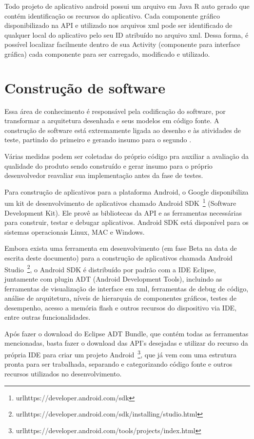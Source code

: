 Todo projeto de aplicativo android possui um arquivo em Java R auto gerado que contém identificação os recursos do aplicativo. Cada componente gráfico disponibilizado na API e utilizado nos arquivos xml pode ser identificado de qualquer local do aplicativo pelo seu ID atribuído no arquivo xml. Dessa forma, é possível localizar facilmente dentro de sua Activity (componente para interface gráfica) cada componente para ser carregado, modificado e utilizado.

\section{Construção de software}

Essa área de conhecimento é responsável pela codificação do software, por transformar a arquitetura desenhada e seus modelos em código fonte. A construção de software está extremamente ligada ao desenho e às atividades de teste, partindo do primeiro e gerando insumo para o segundo \cite{swebok}.

Várias medidas podem ser coletadas do próprio código pra auxiliar a avaliação da qualidade do produto sendo construído e gerar insumo para o próprio desenvolvedor reavaliar sua implementação antes da fase de testes.

Para construção de aplicativos para a plataforma Android, o Google disponibiliza um kit de desenvolvimento de aplicativos chamado Android SDK~\footnote{url{https://developer.android.com/sdk}} (Software Development Kit). Ele provê as bibliotecas da API e as ferramentas necessárias para construir, testar e debugar aplicativos. Android SDK está disponível para os sistemas operacionais Linux, MAC e Windows.

Embora exista uma ferramenta em desenvolvimento (em fase Beta na data de escrita deste documento) para a construção de aplicativos chamada Android Studio~\footnote{url{https://developer.android.com/sdk/installing/studio.html}}, o Android SDK é distribuído por padrão com a IDE Eclipse, juntamente com plugin ADT (Android Development Tools), incluindo as ferramentas de visualização de interface em xml, ferramentas de debug de código, análise de arquitetura, níveis de hierarquia de componentes gráficos, testes de desempenho, acesso a memória flash e outros recursos do dispositivo via IDE, entre outras funcionalidades.

Após fazer o download do Eclipse ADT Bundle, que contém todas as ferramentas mencionadas, basta fazer o download das API's desejadas e utilizar do recurso da própria IDE para criar um projeto Android~\footnote{url{https://developer.android.com/tools/projects/index.html}}, que já vem com uma estrutura pronta para ser trabalhada, separando e categorizando código fonte e outros recursos utilizados no desenvolvimento.

